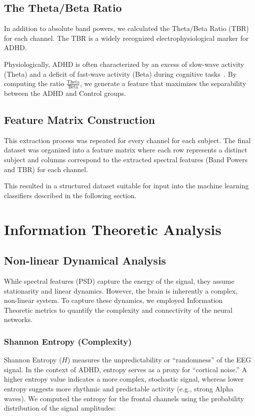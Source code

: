 \documentclass[11pt,a4paper]{article}
\begin{document}
\subsection{The Theta/Beta Ratio}
In addition to absolute band powers, we calculated the Theta/Beta Ratio (TBR) for each channel. The TBR is a widely recognized 
electrophysiological marker for ADHD.

Physiologically, ADHD is often characterized by an excess of slow-wave activity (Theta) and a deficit of fast-wave activity (Beta) during 
cognitive tasks~\cite{clarke2002eeg}. By computing the ratio $\frac{\text{Theta}}{\text{Beta}}$, we generate a feature that maximizes the 
separability between the ADHD and Control groups.


\subsection{Feature Matrix Construction}
This extraction process was repeated for every channel for each subject. The final dataset was organized into a feature matrix where each row 
represents a distinct subject and columns correspond to the extracted spectral features (Band Powers and TBR) for each channel. 

This resulted in a structured dataset suitable for input into the machine learning classifiers described in the following section.


\section{Information Theoretic Analysis}
\subsection{Non-linear Dynamical Analysis}\label{sec:nonlinear}
While spectral features (PSD) capture the energy of the signal, they assume stationarity and linear dynamics. However, the brain is inherently 
a complex, non-linear system. To capture these dynamics, we employed Information Theoretic metrics to quantify the complexity and connectivity 
of the neural networks.


\subsubsection{Shannon Entropy (Complexity)}
Shannon Entropy ($H$) measures the unpredictability or ``randomness'' of the EEG signal. In the context of ADHD, entropy serves as a proxy for 
``cortical noise.'' A higher entropy value indicates a more complex, stochastic signal, whereas lower entropy suggests more rhythmic and 
predictable activity (e.g., strong Alpha waves). We computed the entropy for the frontal channels using the probability distribution of the 
signal amplitudes:
\end{document}
